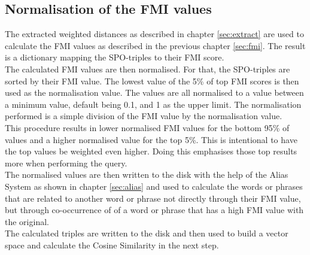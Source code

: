 \subsection{Normalisation of the FMI values}
The extracted weighted distances as described in chapter \ref{sec:extract} are used to calculate the FMI values as described in the previous chapter \ref{sec:fmi}. The result is a dictionary mapping the SPO-triples to their FMI score. \\
The calculated FMI values are then normalised. For that, the SPO-triples are sorted by their FMI value. The lowest value of the 5\% of top FMI scores is then used as the normalisation value. The values are all normalised to a value between a minimum value, default being 0.1, and 1 as the upper limit. The normalisation performed is a simple division of the FMI value by the normalisation value.\\
This procedure results in lower normalised FMI values for the bottom 95\% of values and a higher normalised value for the top 5\%. This is intentional to have the top values be weighted even higher. Doing this emphasises those top results more when performing the query.\\
The normalised values are then written to the disk with the help of the Alias System as shown in chapter \ref{sec:alias} and used to calculate the words or phrases that are related to another word or phrase not directly through their FMI value, but through co-occurrence of of a word or phrase that has a high FMI value with the original.\\
The calculated triples are written to the disk and then used to build a vector space and calculate the Cosine Similarity in the next step.

